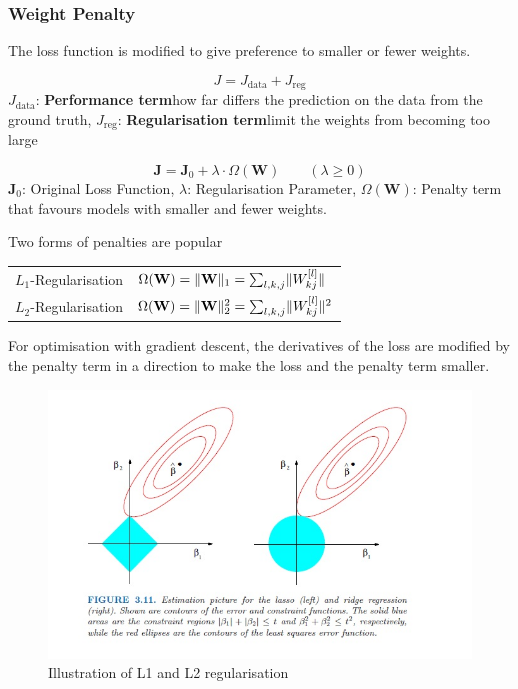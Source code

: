\documentclass[11pt]{article}
\DeclarePairedDelimiter\norm{\lVert}{\rVert}
\begin{document}
\subsubsection{Weight Penalty}
The loss function is modified to give preference to smaller or fewer weights.

\begin{equation*}
	J = J_{\text{data}} + J_{\text{reg}}
\end{equation*}
$J_{\text{data}}$: \textbf{Performance term}\quad how far differs the prediction on the data from the ground truth, $J_{\text{reg}}$: \textbf{Regularisation term}\quad limit the weights from becoming too large

\begin{equation*}
	\textbf{J} = \textbf{J}_0 + \lambda\cdot\Omega(\textbf{W})\qquad(\lambda\geq0)
\end{equation*}
\noindent
$\textbf{J}_0$: Original Loss Function, $\lambda$: Regularisation Parameter, $\Omega(\textbf{W})$: Penalty term that favours models with smaller and fewer weights.

Two forms of penalties are popular
\begin{tabularx}{\linewidth}{X l}
	$L_1$-Regularisation & $ \Omega(\textbf{W}) = \norm{\textbf{W}}_1 = \sum_{l,k,j}\norm{W_{kj}^{[l]}} $\\
	$L_2$-Regularisation & $ \Omega(\textbf{W}) = \norm{\textbf{W}}_2^2 = \sum_{l,k,j}\norm{W_{kj}^{[l]}}^2 $\\
\end{tabularx}

For optimisation with gradient descent, the derivatives of the loss are modified by the penalty term in a direction to make the loss and the penalty term smaller.

\begin{figure}[tbh]
	\centering
	\includegraphics[width=0.6\linewidth,keepaspectratio]{img/L1_L2_regularisation}
	\caption{Illustration of L1 and L2 regularisation}
	\label{fig:l1l2regularisation}
\end{figure}
\end{document}
